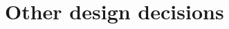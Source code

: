 \documentclass[../../DD.tex]{subfiles}
\begin{document}
\section{Other design decisions\label{sect:2.4}}


\newpage
\end{document}
